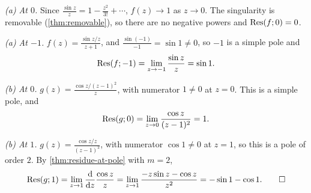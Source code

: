 \begin{solution}
  \emph{(a) At $0$.} Since $\frac{\sin z}{z} = 1 - \frac{z^2}{3!} + \dotsb$,
  $f(z) \to 1$ as $z \to 0$. The singularity is removable
  (\cref{thm:removable}), so there are no negative powers and $\operatorname{Res}(f; 0) = 0$.

  \emph{(a) At $-1$.} $f(z) = \frac{\sin z / z}{z + 1}$, and
  $\frac{\sin(-1)}{-1} = \sin 1 \neq 0$, so $-1$ is a simple pole and
  \[
    \operatorname{Res}(f; -1) = \lim_{z \to -1} \frac{\sin z}{z} = \sin 1.
  \]

  \emph{(b) At $0$.} $g(z) = \frac{\cos z / (z - 1)^2}{z}$, with numerator
  $1 \neq 0$ at $z = 0$. This is a simple pole, and
  \[
    \operatorname{Res}(g; 0) = \lim_{z \to 0} \frac{\cos z}{(z - 1)^2} = 1.
  \]

  \emph{(b) At $1$.} $g(z) = \frac{\cos z / z}{(z - 1)^2}$, with numerator
  $\cos 1 \neq 0$ at $z = 1$, so this is a pole of order $2$. By
  \cref{thm:residue-at-pole} with $m = 2$,
  \[
    \operatorname{Res}(g; 1)
    = \lim_{z \to 1} \frac{\mathop{}\!\mathrm{d}}{\mathop{}\!\mathrm{d} z} \frac{\cos z}{z}
    = \lim_{z \to 1} \frac{-z \sin z - \cos z}{z^2}
    = -\sin 1 - \cos 1. \qedhere
  \]
\end{solution}
